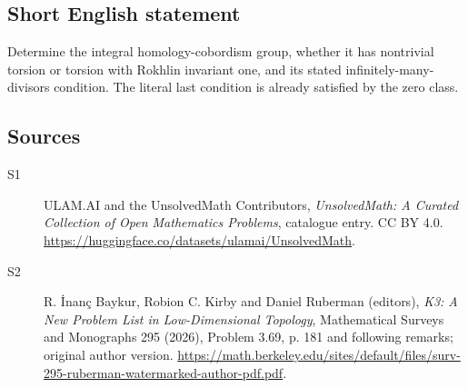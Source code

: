 \documentclass[11pt]{article}
\begin{document}
\subsection{Short English statement}
Determine the integral homology-cobordism group, whether it has nontrivial torsion or torsion with Rokhlin invariant one, and its stated infinitely-many-divisors condition. The literal last condition is already satisfied by the zero class.
\subsection{Sources}
\begin{description}
\item[\hypertarget{source:statement:1}{S1}] ULAM.AI and the UnsolvedMath Contributors, \emph{UnsolvedMath: A Curated Collection of Open Mathematics Problems}, catalogue entry. CC BY 4.0. \url{https://huggingface.co/datasets/ulamai/UnsolvedMath}.
\item[\hypertarget{source:statement:2}{S2}] R. İnanç Baykur, Robion C. Kirby and Daniel Ruberman (editors), \emph{K3: A New Problem List in Low-Dimensional Topology}, Mathematical Surveys and Monographs 295 (2026), Problem 3.69, p. 181 and following remarks; original author version. \url{https://math.berkeley.edu/sites/default/files/surv-295-ruberman-watermarked-author-pdf.pdf}.
\end{description}
\label{end:statement}
\end{document}

